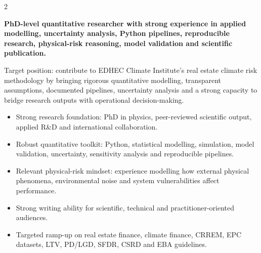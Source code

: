 \documentclass[8pt,a4paper,ragged2e,withhyper]{altacv}
\begin{document}
\begin{paracol}{2}
\switchcolumn


\textbf{PhD-level quantitative researcher with strong experience in applied modelling, uncertainty analysis, Python pipelines, reproducible research, physical-risk reasoning, model validation and scientific publication.}

Target position: contribute to EDHEC Climate Institute’s real estate climate risk methodology by bringing rigorous quantitative modelling, transparent assumptions, documented pipelines, uncertainty analysis and a strong capacity to bridge research outputs with operational decision-making.

\begin{itemize}
  \item Strong research foundation: PhD in physics, peer-reviewed scientific output, applied R\&D and international collaboration.
  \item Robust quantitative toolkit: Python, statistical modelling, simulation, model validation, uncertainty, sensitivity analysis and reproducible pipelines.
  \item Relevant physical-risk mindset: experience modelling how external physical phenomena, environmental noise and system vulnerabilities affect performance.
  \item Strong writing ability for scientific, technical and practitioner-oriented audiences.
  \item Targeted ramp-up on real estate finance, climate finance, CRREM, EPC datasets, LTV, PD/LGD, SFDR, CSRD and EBA guidelines.
\end{itemize}


\divider
{}
\divider

\medskip



\divider


\divider


\divider


\end{paracol}
\end{document}
